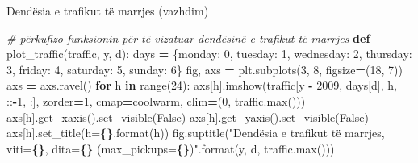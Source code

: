 \documentclass[
  ignorenonframetext,
]{beamer}
\newenvironment{Shaded}{\begin{snugshade}}{\end{snugshade}}
\newcommand{\BuiltInTok}[1]{#1}
\newcommand{\CommentTok}[1]{\textcolor[rgb]{0.56,0.35,0.01}{\textit{#1}}}
\newcommand{\ControlFlowTok}[1]{\textcolor[rgb]{0.13,0.29,0.53}{\textbf{#1}}}
\newcommand{\DecValTok}[1]{\textcolor[rgb]{0.00,0.00,0.81}{#1}}
\newcommand{\KeywordTok}[1]{\textcolor[rgb]{0.13,0.29,0.53}{\textbf{#1}}}
\newcommand{\NormalTok}[1]{#1}
\newcommand{\OperatorTok}[1]{\textcolor[rgb]{0.81,0.36,0.00}{\textbf{#1}}}
\newcommand{\SpecialCharTok}[1]{\textcolor[rgb]{0.81,0.36,0.00}{\textbf{#1}}}
\newcommand{\StringTok}[1]{\textcolor[rgb]{0.31,0.60,0.02}{#1}}
\newcommand{\VariableTok}[1]{\textcolor[rgb]{0.00,0.00,0.00}{#1}}
\begin{document}
\begin{frame}[fragile]{Dendësia e trafikut të marrjes (vazhdim)}
\protect\hypertarget{denduxebsia-e-trafikut-tuxeb-marrjes-vazhdim-1}{}

\begin{Shaded}
\begin{Highlighting}[]
\CommentTok{\# përkufizo funksionin për të vizatuar dendësinë e trafikut të marrjes}
\KeywordTok{def}\NormalTok{ plot\_traffic(traffic, y, d):}
\NormalTok{    days }\OperatorTok{=}\NormalTok{ \{}\StringTok{\textquotesingle{}monday\textquotesingle{}}\NormalTok{: }\DecValTok{0}\NormalTok{, }\StringTok{\textquotesingle{}tuesday\textquotesingle{}}\NormalTok{: }\DecValTok{1}\NormalTok{, }\StringTok{\textquotesingle{}wednesday\textquotesingle{}}\NormalTok{: }\DecValTok{2}\NormalTok{, }\StringTok{\textquotesingle{}thursday\textquotesingle{}}\NormalTok{: }\DecValTok{3}\NormalTok{, }\StringTok{\textquotesingle{}friday\textquotesingle{}}\NormalTok{: }\DecValTok{4}\NormalTok{, }\StringTok{\textquotesingle{}saturday\textquotesingle{}}\NormalTok{: }\DecValTok{5}\NormalTok{, }\StringTok{\textquotesingle{}sunday\textquotesingle{}}\NormalTok{: }\DecValTok{6}\NormalTok{\}}
\NormalTok{    fig, axs }\OperatorTok{=}\NormalTok{ plt.subplots(}\DecValTok{3}\NormalTok{, }\DecValTok{8}\NormalTok{, figsize}\OperatorTok{=}\NormalTok{(}\DecValTok{18}\NormalTok{, }\DecValTok{7}\NormalTok{))}
\NormalTok{    axs }\OperatorTok{=}\NormalTok{ axs.ravel()}
    \ControlFlowTok{for}\NormalTok{ h }\KeywordTok{in} \BuiltInTok{range}\NormalTok{(}\DecValTok{24}\NormalTok{):}
\NormalTok{        axs[h].imshow(traffic[y }\OperatorTok{{-}} \DecValTok{2009}\NormalTok{, days[d], h, ::}\OperatorTok{{-}}\DecValTok{1}\NormalTok{, :], zorder}\OperatorTok{=}\DecValTok{1}\NormalTok{, cmap}\OperatorTok{=}\StringTok{\textquotesingle{}coolwarm\textquotesingle{}}\NormalTok{, clim}\OperatorTok{=}\NormalTok{(}\DecValTok{0}\NormalTok{, traffic.}\BuiltInTok{max}\NormalTok{()))}
\NormalTok{        axs[h].get\_xaxis().set\_visible(}\VariableTok{False}\NormalTok{)}
\NormalTok{        axs[h].get\_yaxis().set\_visible(}\VariableTok{False}\NormalTok{)}
\NormalTok{        axs[h].set\_title(}\StringTok{\textquotesingle{}h=}\SpecialCharTok{\{\}}\StringTok{\textquotesingle{}}\NormalTok{.}\BuiltInTok{format}\NormalTok{(h))}
\NormalTok{    fig.suptitle(}\StringTok{"Dendësia e trafikut të marrjes, viti=}\SpecialCharTok{\{\}}\StringTok{, dita=}\SpecialCharTok{\{\}}\StringTok{ (max\_pickups=}\SpecialCharTok{\{\}}\StringTok{)"}\NormalTok{.}\BuiltInTok{format}\NormalTok{(y, d, traffic.}\BuiltInTok{max}\NormalTok{()))}
\end{Highlighting}
\end{Shaded}
\end{frame}
\end{document}
